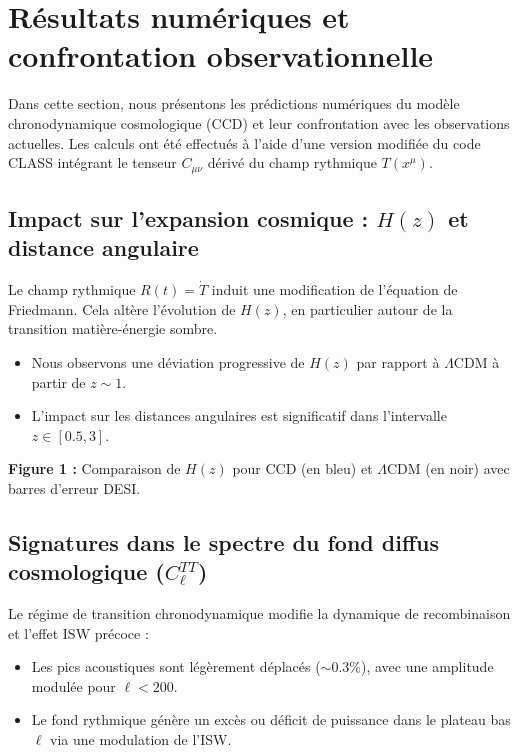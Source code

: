 
\section{Résultats numériques et confrontation observationnelle}

Dans cette section, nous présentons les prédictions numériques du modèle chronodynamique cosmologique (CCD) et leur confrontation avec les observations actuelles. Les calculs ont été effectués à l’aide d’une version modifiée du code CLASS intégrant le tenseur $C_{\mu\nu}$ dérivé du champ rythmique $T(x^\mu)$.

\subsection{Impact sur l’expansion cosmique : $H(z)$ et distance angulaire}

Le champ rythmique $R(t) = \dot{T}$ induit une modification de l’équation de Friedmann. Cela altère l’évolution de $H(z)$, en particulier autour de la transition matière-énergie sombre.

\begin{itemize}
  \item Nous observons une déviation progressive de $H(z)$ par rapport à $\Lambda$CDM à partir de $z \sim 1$.
  \item L’impact sur les distances angulaires est significatif dans l’intervalle $z \in [0.5, 3]$.
\end{itemize}

\textbf{Figure 1 :} Comparaison de $H(z)$ pour CCD (en bleu) et $\Lambda$CDM (en noir) avec barres d’erreur DESI.

\subsection{Signatures dans le spectre du fond diffus cosmologique ($C_\ell^{TT}$)}

Le régime de transition chronodynamique modifie la dynamique de recombinaison et l’effet ISW précoce :

\begin{itemize}
  \item Les pics acoustiques sont légèrement déplacés ($\sim 0.3\%$), avec une amplitude modulée pour $\ell < 200$.
  \item Le fond rythmique génère un excès ou déficit de puissance dans le plateau bas $\ell$ via une modulation de l’ISW.
\end{itemize}


